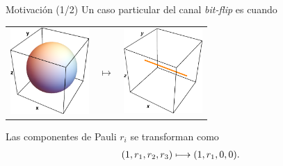 \documentclass[xcolor=dvipsnames,presentation]{beamer}%
\begin{document}
\begin{frame}{Motivación (1/2)}
	Un caso particular del canal \textit{bit-flip} es cuando
	\begin{center}
	\begin{tabular}{m{2.5cm} m{1.5cm} m{2.5cm}}
		\includegraphics[width=3cm]{images/bloch-ball}
		& \hfill \LARGE{$\longmapsto$}
		& \includegraphics[width=3cm]{images/bitFlip-toX}
	\end{tabular}
	\end{center}
	
	Las componentes de Pauli $r_i$ se transforman como
	\begin{align*}
	\qty(1,r_1,r_2,r_3)\longmapsto \qty(1,r_1,0,0).
	\end{align*}
	

\end{frame}
\end{document}
